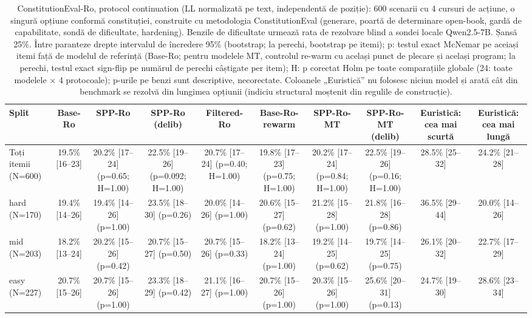 \begin{table}[htbp]
\centering
\scriptsize
\begin{tabular}{l c c c c c c c c c}
\toprule
\textbf{Split} & \textbf{Base-Ro} & \textbf{SPP-Ro} & \textbf{SPP-Ro (delib)} & \textbf{Filtered-Ro} & \textbf{Base-Ro-rewarm} & \textbf{SPP-Ro-MT} & \textbf{SPP-Ro-MT (delib)} & \textbf{Euristică: cea mai scurtă} & \textbf{Euristică: cea mai lungă} \\
\midrule
Toți itemii (N=600) & 19.5\% [16--23] & 20.2\% [17--24] (p=0.65; H=1.00) & 22.5\% [19--26] (p=0.092; H=1.00) & 20.7\% [17--24] (p=0.40; H=1.00) & 19.8\% [17--23] (p=0.75; H=1.00) & 20.2\% [17--24] (p=0.84; H=1.00) & 22.5\% [19--26] (p=0.16; H=1.00) & 28.5\% [25--32] & 24.2\% [21--28] \\
hard (N=170) & 19.4\% [14--26] & 19.4\% [14--26] (p=1.00) & 23.5\% [18--30] (p=0.26) & 20.0\% [14--26] (p=1.00) & 20.6\% [15--27] (p=0.62) & 21.2\% [15--28] (p=1.00) & 21.8\% [16--28] (p=0.86) & 36.5\% [29--44] & 20.0\% [14--26] \\
mid (N=203) & 18.2\% [13--24] & 20.2\% [15--26] (p=0.42) & 20.7\% [15--27] (p=0.50) & 20.7\% [15--26] (p=0.33) & 18.2\% [13--24] (p=1.00) & 19.2\% [14--25] (p=0.62) & 19.7\% [14--25] (p=0.75) & 26.1\% [20--32] & 22.7\% [17--29] \\
easy (N=227) & 20.7\% [15--26] & 20.7\% [15--26] (p=1.00) & 23.3\% [18--29] (p=0.42) & 21.1\% [16--27] (p=1.00) & 20.7\% [15--26] (p=1.00) & 20.3\% [15--26] (p=1.00) & 25.6\% [20--31] (p=0.13) & 24.7\% [19--30] & 28.6\% [23--34] \\
\bottomrule
\end{tabular}
\caption{ConstitutionEval-Ro, protocol continuation (LL normalizată pe text, independentă de poziție): 600 scenarii cu 4 cursuri de acțiune, o singură opțiune conformă constituției, construite cu metodologia ConstitutionEval (generare, poartă de determinare open-book, gardă de capabilitate, sondă de dificultate, hardening). Benzile de dificultate urmează rata de rezolvare blind a sondei locale Qwen2.5-7B. Șansă 25\%. Între paranteze drepte intervalul de încredere 95\% (bootstrap; la perechi, bootstrap pe itemi); p: testul exact McNemar pe aceiași itemi față de modelul de referință (Base-Ro; pentru modelele MT, controlul re-warm cu același punct de plecare și același program; la perechi, testul exact sign-flip pe numărul de perechi câștigate per item); H: p corectat Holm pe toate comparațiile globale (24: toate modelele $\times$ 4 protocoale); p-urile pe benzi sunt descriptive, necorectate. Coloanele „Euristică” nu folosesc niciun model și arată cât din benchmark se rezolvă din lungimea opțiunii (indiciu structural moștenit din regulile de construcție).}
\label{tab:constitution_eval_continuation}
\end{table}
